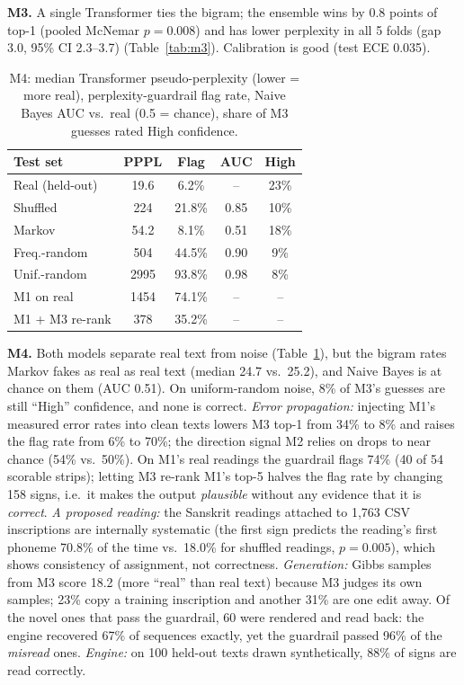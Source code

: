 \documentclass[11pt,a4paper,twocolumn]{article}
\begin{document}
\textbf{M3.} A single Transformer ties the bigram; the ensemble wins by 0.8 points of top-1 (pooled
McNemar $p=0.008$) and has lower perplexity in all 5 folds (gap 3.0, 95\% CI 2.3--3.7)
(Table~\ref{tab:m3}). Calibration is good (test ECE 0.035).


\begin{table}[h]
\centering
\small
\setlength{\tabcolsep}{3.5pt}
\begin{tabular}{lcccc}
\toprule
Test set & PPPL & Flag & AUC & High \\
\midrule
Real (held-out) & 19.6 & 6.2\% & -- & 23\% \\
Shuffled & 224 & 21.8\% & 0.85 & 10\% \\
Markov & 54.2 & 8.1\% & 0.51 & 18\% \\
Freq.-random & 504 & 44.5\% & 0.90 & 9\% \\
Unif.-random & 2995 & 93.8\% & 0.98 & 8\% \\
\midrule
M1 on real & 1454 & 74.1\% & -- & -- \\
M1 + M3 re-rank & 378 & 35.2\% & -- & -- \\
\bottomrule
\end{tabular}
\caption{M4: median Transformer pseudo-perplexity (lower = more real), perplexity-guardrail flag rate,
Naive Bayes AUC vs.\ real (0.5 = chance), share of M3 guesses rated High confidence.}
\label{tab:m4}
\end{table}

\textbf{M4.} Both models separate real text from noise (Table~\ref{tab:m4}), but
the bigram rates Markov fakes as real as real text (median 24.7 vs.\ 25.2), and Naive Bayes is at chance
on them (AUC 0.51). On uniform-random noise, 8\% of M3's guesses are still ``High'' confidence, and none
is correct. \emph{Error propagation:} injecting M1's measured error rates into clean texts lowers M3
top-1 from 34\% to 8\% and raises the flag rate from 6\% to 70\%; the direction signal M2 relies on drops
to near chance (54\% vs.\ 50\%). On M1's real readings the guardrail flags 74\% (40 of 54 scorable
strips); letting M3 re-rank M1's top-5 halves the flag rate by changing 158 signs, i.e.\ it makes the
output \emph{plausible} without any evidence that it is \emph{correct}. \emph{A proposed reading:} the
Sanskrit readings attached to 1,763 CSV inscriptions are internally systematic (the first sign predicts
the reading's first phoneme 70.8\% of the time vs.\ 18.0\% for shuffled readings, $p=0.005$), which
shows consistency of assignment, not correctness. \emph{Generation:} Gibbs samples from M3 score 18.2
(more ``real'' than real text) because M3 judges its own samples; 23\% copy a training inscription and
another 31\% are one edit away. Of the novel ones that pass the guardrail, 60 were rendered and read back:
the engine recovered 67\% of sequences exactly, yet the guardrail passed 96\% of the \emph{misread}
ones. \emph{Engine:} on 100 held-out texts drawn synthetically, 88\% of signs are read correctly.
\end{document}
